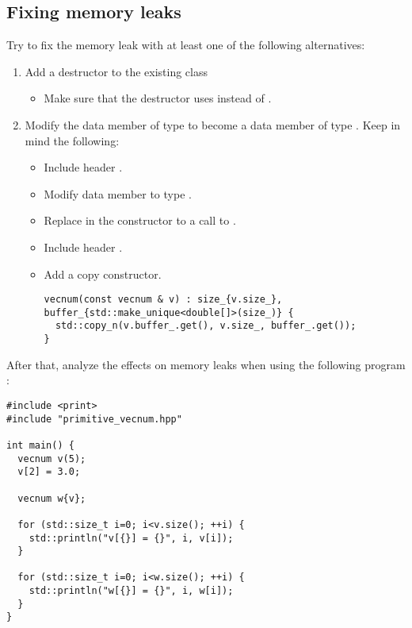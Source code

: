 \subsection{Fixing memory leaks}

Try to fix the memory leak with at least one of the following alternatives:

\begin{enumerate}

\item 
Add a destructor to the existing class
\begin{itemize}
  \item Make sure that the destructor uses
          
        instead of  .
\end{itemize}

\item 
Modify the data member of type  
to become a data member of type
.
Keep in mind the following:

\begin{itemize}
  \item Include header .

  \item Modify data member  to type .

  \item Replace  in the constructor to a call to 
        .

  \item Include header .

  \item Add a copy constructor.

\begin{lstlisting}
vecnum(const vecnum & v) : size_{v.size_}, buffer_{std::make_unique<double[]>(size_)} {
  std::copy_n(v.buffer_.get(), v.size_, buffer_.get());
}
\end{lstlisting}
\end{itemize}

\end{enumerate}

After that, analyze the effects on memory leaks when using the following
program 
:

\begin{lstlisting}
#include <print>
#include "primitive_vecnum.hpp"

int main() {
  vecnum v(5);
  v[2] = 3.0;

  vecnum w{v};

  for (std::size_t i=0; i<v.size(); ++i) {
    std::println("v[{}] = {}", i, v[i]);
  }

  for (std::size_t i=0; i<w.size(); ++i) {
    std::println("w[{}] = {}", i, w[i]);
  }
}
\end{lstlisting}
